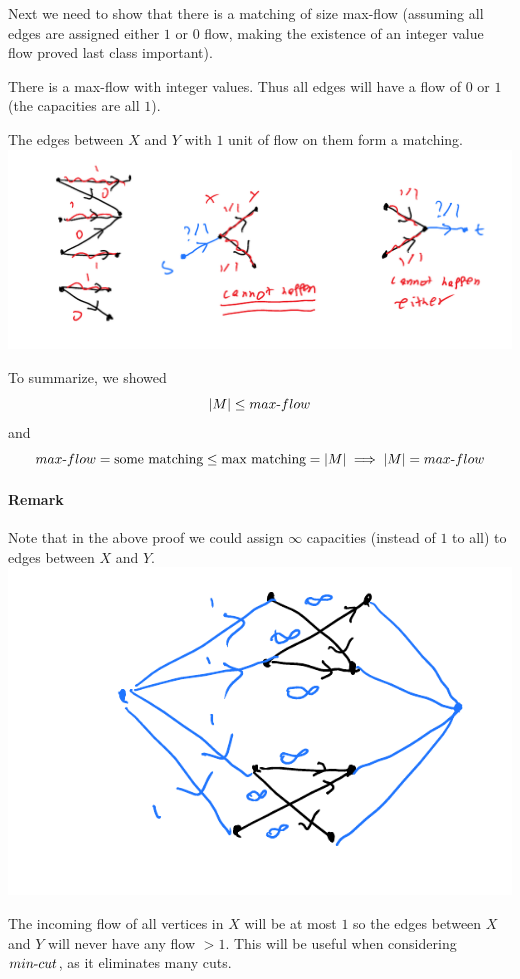 \documentclass[12 pt]{article}
\begin{document}
        Next we need to show that there is a matching of size
        max\hbox{-}flow (assuming all edges are assigned either $1$ or
        $0$ flow, making the existence of an integer value flow proved
        last class important).

        There is a max\hbox{-}flow with integer values. Thus all edges
        will have a flow of $0$ or $1$ (the capacities are all $1$).

        The edges between $X$ and $Y$ with $1$ unit of flow on them
        form a matching.
        \\ \includegraphics[width=.9\textwidth]{i53.pdf}

        To summarize, we showed
        $$|M| \leq max\hbox{-}flow$$ and $$max\hbox{-}flow =
        \text{some matching} \leq \text{max matching} = |M| \implies
        |M| = max\hbox{-}flow$$
        \paragraph{Remark} Note that in the above proof we could
        assign $\infty$ capacities (instead of $1$ to all) to edges
        between $X$ and $Y$.
        \\ \includegraphics[width=.9\textwidth]{i54.pdf}

        The incoming flow of all vertices in $X$ will be at most $1$
        so the edges between $X$ and $Y$ will never have any flow
        $>1$. This will be useful when considering $min\hbox{-}cut$,
        as it eliminates many cuts.
\end{document}

